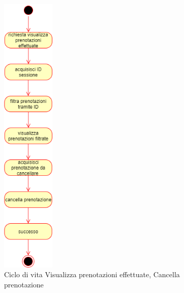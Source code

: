 \documentclass[11pt]{article}
\begin{document}
\begin{figure}[H]
\centering
\includegraphics[width=0.225\textwidth]{Ciclo di vita Visualizza prenotazioni, Cancella prenotazione.png}
\caption{Ciclo di vita Visualizza prenotazioni effettuate, Cancella prenotazione}
\end{figure}
\end{document}
